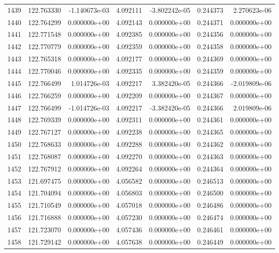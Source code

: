 \begin{tabular}{rrrrrrr}
1439 & 122.763330 & -1.140673e-03 &  4.092111 & -3.802242e-05 &    0.244373 &  2.270623e-06 \\
1440 & 122.764299 &  0.000000e+00 &  4.092143 &  0.000000e+00 &    0.244371 &  0.000000e+00 \\
1441 & 122.771548 &  0.000000e+00 &  4.092385 &  0.000000e+00 &    0.244356 &  0.000000e+00 \\
1442 & 122.770779 &  0.000000e+00 &  4.092359 &  0.000000e+00 &    0.244358 &  0.000000e+00 \\
1443 & 122.765318 &  0.000000e+00 &  4.092177 &  0.000000e+00 &    0.244369 &  0.000000e+00 \\
1444 & 122.770046 &  0.000000e+00 &  4.092335 &  0.000000e+00 &    0.244359 &  0.000000e+00 \\
1445 & 122.766499 &  1.014726e-03 &  4.092217 &  3.382420e-05 &    0.244366 & -2.019809e-06 \\
1446 & 122.766259 &  0.000000e+00 &  4.092209 &  0.000000e+00 &    0.244367 &  0.000000e+00 \\
1447 & 122.766499 & -1.014726e-03 &  4.092217 & -3.382420e-05 &    0.244366 &  2.019809e-06 \\
1448 & 122.769339 &  0.000000e+00 &  4.092311 &  0.000000e+00 &    0.244361 &  0.000000e+00 \\
1449 & 122.767127 &  0.000000e+00 &  4.092238 &  0.000000e+00 &    0.244365 &  0.000000e+00 \\
1450 & 122.768633 &  0.000000e+00 &  4.092288 &  0.000000e+00 &    0.244362 &  0.000000e+00 \\
1451 & 122.768087 &  0.000000e+00 &  4.092270 &  0.000000e+00 &    0.244363 &  0.000000e+00 \\
1452 & 122.767912 &  0.000000e+00 &  4.092264 &  0.000000e+00 &    0.244364 &  0.000000e+00 \\
1453 & 121.697475 &  0.000000e+00 &  4.056582 &  0.000000e+00 &    0.246513 &  0.000000e+00 \\
1454 & 121.704094 &  0.000000e+00 &  4.056803 &  0.000000e+00 &    0.246500 &  0.000000e+00 \\
1455 & 121.710549 &  0.000000e+00 &  4.057018 &  0.000000e+00 &    0.246486 &  0.000000e+00 \\
1456 & 121.716888 &  0.000000e+00 &  4.057230 &  0.000000e+00 &    0.246474 &  0.000000e+00 \\
1457 & 121.723070 &  0.000000e+00 &  4.057436 &  0.000000e+00 &    0.246461 &  0.000000e+00 \\
1458 & 121.729142 &  0.000000e+00 &  4.057638 &  0.000000e+00 &    0.246449 &  0.000000e+00 \\

\end{tabular}
